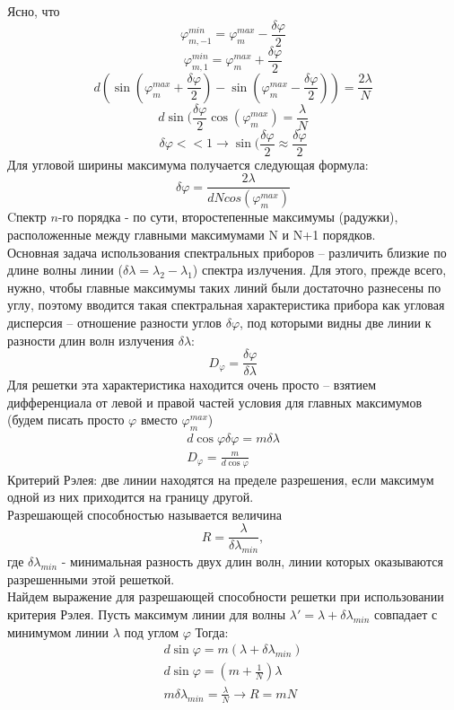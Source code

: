 Ясно, что 
$$\varphi^{min}_{m, -1} = \varphi^{max}_{m} - \frac{\delta \varphi}{2}$$
$$\varphi^{min}_{m, 1} = \varphi^{max}_{m} + \frac{\delta\varphi}{2}$$
$$d(\sin(\varphi^{max}_{m} + \frac{\delta\varphi}{2}) - \sin(\varphi^{max}_{m} - \frac{\delta\varphi}{2})) = \frac{2\lambda}{N} $$
$$d\sin(\frac{\delta \varphi}{2} \cos(\varphi^{max}_m) = \frac{\lambda}{N}$$
$$\delta\varphi << 1 \rightarrow \sin(\frac{\delta\varphi}{2} \approx \frac{\delta\varphi}{2}$$
Для угловой ширины максимума получается следующая формула:
$$\delta\varphi = \frac{2\lambda}{dNcos(\varphi^{max}_m)}$$
Cпектр $n$-го порядка - по сути, второстепенные максимумы (радужки), расположенные между главными максимумами N и N+1 порядков.\\
Основная задача использования спектральных приборов – различить близкие по длине волны линии ($\delta \lambda = \lambda_2 - \lambda_1$) спектра излучения. Для этого, прежде всего, нужно, чтобы главные максимумы таких линий были достаточно разнесены по углу, поэтому вводится такая спектральная характеристика прибора как угловая дисперсия – отношение разности углов $\delta\varphi$, под которыми видны две линии к разности длин волн излучения $\delta\lambda$:
$$D_\varphi = \frac{\delta\varphi}{\delta\lambda}$$
Для решетки эта характеристика находится очень просто – взятием дифференциала от левой и правой частей условия для главных максимумов (будем писать просто $\varphi$ вместо $\varphi^{max}_m$)
\begin{gather*}
d\cos\varphi \delta\varphi = m\delta\lambda\\
D_\varphi = \frac{m}{d\cos \varphi}
\end{gather*}
Критерий Рэлея: две линии находятся на пределе разрешения, если максимум одной из них приходится на границу другой.\\
Разрешающей способностью называется величина
$$R = \frac{\lambda}{\delta\lambda_{min}},$$
где $\delta\lambda_{min}$ - минимальная разность двух длин волн, линии которых оказываются разрешенными этой решеткой. \\
Найдем выражение для разрешающей способности решетки при использовании критерия Рэлея. Пусть максимум линии для волны $\lambda' = \lambda + \delta\lambda_{min}$ совпадает с минимумом линии $\lambda$ под углом $\varphi$
Тогда:
\begin{gather*}
d\sin\varphi = m(\lambda + \delta \lambda_{min})\\
d\sin\varphi = (m + \frac{1}{N})\lambda\\
m\delta\lambda_{min} = \frac{\lambda}{N} \longrightarrow R = mN
\end{gather*}
 
